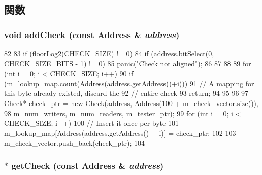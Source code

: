 \subsection{関数}
\hypertarget{classCheckTable_ae2fdd769e0caa9423868851dac434175}{
\subsubsection[{addCheck}]{\setlength{\rightskip}{0pt plus 5cm}void addCheck (const {\bf Address} \& {\em address})}}
\label{classCheckTable_ae2fdd769e0caa9423868851dac434175}



\begin{DoxyCode}
82 {
83     if (floorLog2(CHECK_SIZE) != 0) {
84         if (address.bitSelect(0, CHECK_SIZE_BITS - 1) != 0) {
85             panic("Check not aligned");
86         }
87     }
88 
89     for (int i = 0; i < CHECK_SIZE; i++) {
90         if (m_lookup_map.count(Address(address.getAddress()+i))) {
91             // A mapping for this byte already existed, discard the
92             // entire check
93             return;
94         }
95     }
96 
97     Check* check_ptr = new Check(address, Address(100 + m_check_vector.size()),
98                                  m_num_writers, m_num_readers, m_tester_ptr);
99     for (int i = 0; i < CHECK_SIZE; i++) {
100         // Insert it once per byte
101         m_lookup_map[Address(address.getAddress() + i)] = check_ptr;
102     }
103     m_check_vector.push_back(check_ptr);
104 }
\end{DoxyCode}
\hypertarget{classCheckTable_ae48218016205b6d25f2ea8289929f9e5}{
\subsubsection[{getCheck}]{ $\ast$ getCheck (const {\bf Address} \& {\em address})}}
\label{classCheckTable_ae48218016205b6d25f2ea8289929f9e5}



